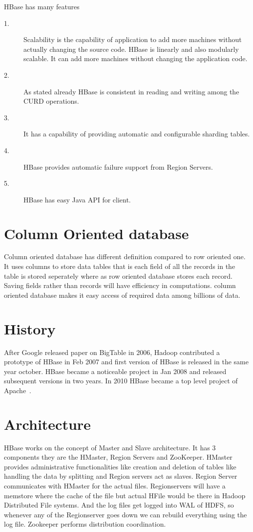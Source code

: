  HBase has many features~\cite{hid-sp18-421-HBase-feature}
 \begin{description}
  \item [1.] Scalability is the capability of application to add more machines without 
 actually changing the source code. HBase is linearly and also modularly 
 scalable. It can add more machines without changing the application code.
 \item [2.] As stated already HBase is consistent in reading and writing among the CURD 
 operations.
 \item [3.] It has a capability of providing automatic and configurable sharding tables.
 \item [4.] HBase provides automatic failure support from Region Servers.
 \item [5.] HBase has easy Java API for client.
 \end{description}

\section{Column Oriented database}

Column oriented database has different definition compared to row oriented one. 
It uses columns to store data tables that is each field of all the records in 
the table is stored  seperately where as row oriented database stores each 
record. Saving fields rather than records will have efficiency in computations.
column oriented database makes it easy access of required data among billions of 
data. 

\section{History}

 After Google released paper on BigTable in 2006, Hadoop contributed a prototype
of HBase in Feb 2007 and first version of HBase is released in the same year 
october. HBase became a noticeable project in Jan 2008 and released subsequent 
versions in two years. In 2010 HBase became a top level project of 
Apache~\cite{hid-sp18-421-HBase-history}.

\section{Architecture}

HBase works on the concept of Master and Slave architecture. It has 3
components they are the HMaster, Region Servers and ZooKeeper.   HMaster
provides administrative functionalities like creation and deletion of tables
like handling the data by splitting and Region servers act as slaves. Region
Server communicates with HMaster for the actual files. Regionservers will have a
memstore where the cache of the file but actual HFile  would be there in Hadoop
Distributed File systems. And the log files get logged  into WAL of HDFS, so
whenever any of the Regionserver goes down we can rebuild  everything using the
log file. Zookeeper performs distribution coordination.

